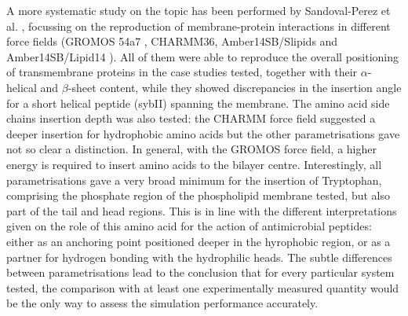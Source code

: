 A more systematic study on the topic has been performed by Sandoval-Perez et al. \cite{Sandoval-Perez2017}, focussing on the reproduction of membrane-protein interactions in different force fields (GROMOS 54a7 \cite{Schmid2011}, CHARMM36, Amber14SB/Slipids \cite{Jambeck2012} and Amber14SB/Lipid14 \cite{Dickson2014}).
%
All of them were able to reproduce the overall positioning of transmembrane proteins in the case studies tested, together with their $\alpha$-helical and $\beta$-sheet content, while they showed discrepancies in the insertion angle for a short helical peptide (sybII) spanning the membrane.
%
The amino acid side chains insertion depth was also tested: the CHARMM force field suggested a deeper insertion for hydrophobic amino acids but the other parametrisations gave not so clear a distinction. In general, with the GROMOS force field, a higher energy is required to insert amino acids to the bilayer centre.
%
Interestingly, all parametrisations gave a very broad minimum for the insertion of Tryptophan, comprising the phosphate region of the phospholipid membrane tested, but also part of the tail and head regions. This is in line with the different interpretations given on the role of this amino acid for the action of antimicrobial peptides: either as an anchoring point positioned deeper in the hyrophobic region, or as a partner for hydrogen bonding with the hydrophilic heads.
%
The subtle differences between parametrisations lead to the conclusion that for every particular system tested, the comparison with at least one experimentally measured quantity would be the only way to assess the simulation performance accurately.

